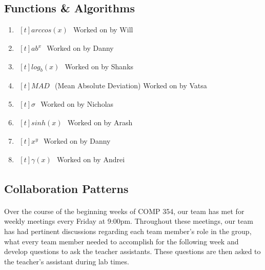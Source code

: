     \subsection{Functions \& Algorithms}
        \begin{enumerate}
            \item $\begin{aligned}[t]
                arccos(x)
            \end{aligned}$
                Worked on by Will
            \item $\begin{aligned}[t]
                ab^x
            \end{aligned}$
                Worked on by Danny
            \item $\begin{aligned}[t]
                log_{b}(x)
            \end{aligned}$
                Worked on by Shanks
            \item $\begin{aligned}[t]
                MAD
            \end{aligned}$
                (Mean Absolute Deviation) Worked on by Vatsa
            \item $\begin{aligned}[t]
                \sigma
            \end{aligned}$
                Worked on by Nicholas
            \item $\begin{aligned}[t]
                sinh(x)
            \end{aligned}$
                Worked on by Arash
            \item $\begin{aligned}[t]
                x^y
            \end{aligned}$
                Worked on by Danny
            \item $\begin{aligned}[t]
                \gamma(x)
            \end{aligned}$
                Worked on by Andrei
        \end{enumerate}

    \subsection{Collaboration Patterns}
        \paragraph{}
        Over the course of the beginning weeks of COMP 354, our team has met for weekly meetings every Friday at 9:00pm. Throughout these meetings, our team has had pertinent discussions regarding each team member’s role in the group, what every team member needed to accomplish for the following week and develop questions to ask the teacher assistants. These questions are then asked to the teacher’s assistant during lab times.

